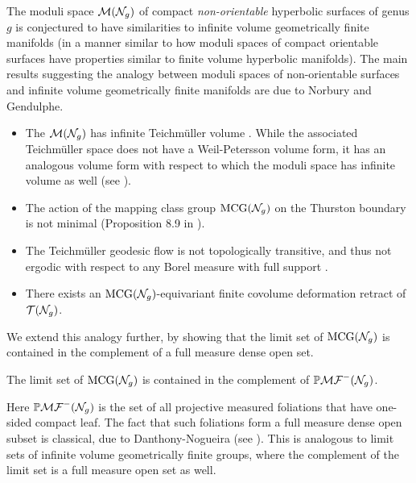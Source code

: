 

The moduli space $\mathcal{M}(\mathcal{N}_g)$ of compact \emph{non-orientable} hyperbolic surfaces of genus $g$ is conjectured to have similarities to infinite volume geometrically finite manifolds (in a manner similar to how moduli spaces of compact orientable surfaces have properties similar to finite volume hyperbolic manifolds).
The main results suggesting the analogy between moduli spaces of non-orientable surfaces and infinite volume geometrically finite manifolds are due to Norbury and Gendulphe.

\begin{itemize}
\item The $\mathcal{M}(\mathcal{N}_g)$ has infinite Teichm\"uller volume \cite[Theorem 17.1]{gendulphe2017whats}.
  While the associated Teichm\"uller space does not have a Weil-Petersson volume form, it has an analogous volume form with respect to which the moduli space has infinite volume as well (see \cite{norbury2008lengths}).
\item The action of the mapping class group $\mathrm{MCG}(\mathcal{N}_g)$ on the Thurston boundary is not minimal (Proposition 8.9 in \cite{gendulphe2017whats}).
\item The Teichm\"uller geodesic flow is not topologically transitive, and thus not ergodic with respect to any Borel measure with full support \cite[Proposition 17.5]{gendulphe2017whats}.
\item There exists an $\mathrm{MCG}(\mathcal{N}_g)$-equivariant finite covolume deformation retract of $\mathcal{T}(\mathcal{N}_g)$.
\end{itemize}

We extend this analogy further, by showing that the limit set of $\mathrm{MCG}(\mathcal{N}_g)$ is contained in the complement of a full measure dense open set.
\begingroup
\def\thetheorem{\ref{cor:geolimset}}
\begin{theorem}
  The limit set of $\mathrm{MCG}(\mathcal{N}_g)$ is contained in the complement of $\mathbb{P}\mathcal{MF}^-(\mathcal{N}_g)$.
\end{theorem}
\addtocounter{theorem}{-1}
\endgroup
Here $\mathbb{P}\mathcal{MF}^-(\mathcal{N}_g)$ is the set of all projective measured foliations that have one-sided compact leaf.
The fact that such foliations form a full measure dense open subset is classical, due to Danthony-Nogueira (see \cite{ASENS_1990_4_23_3_469_0}).
This is analogous to limit sets of infinite volume geometrically finite groups, where the complement of the limit set is a full measure open set as well.

